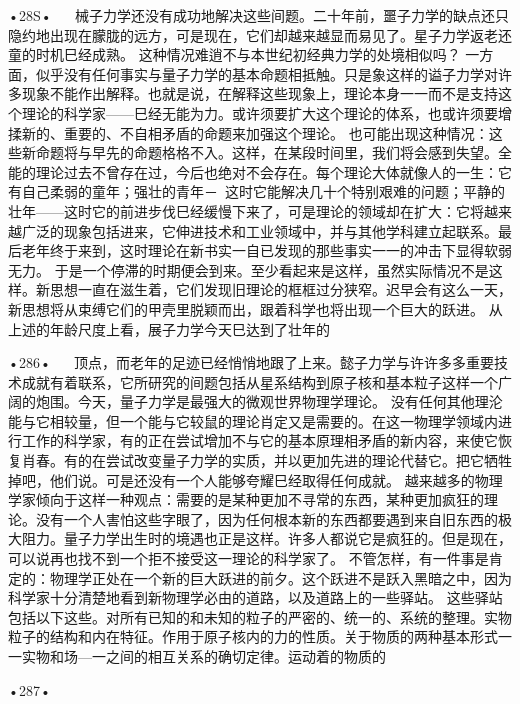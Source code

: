 •28S•
  
械子力学还没有成功地解决这些间题。二十年前，噩子力学的缺点还只隐约地出现在朦胧的远方，可是现在，它们却越来越显而易见了。星子力学返老还童的时机巳经成熟。
这种情况难逍不与本世纪初经典力学的处境相似吗？
一方面，似乎没有任何事实与量子力学的基本命题相抵触。只是象这样的谥子力学对许多现象不能作出解释。也就是说，在解释这些现象上，理论本身一一而不是支持这个理论的科学家——巳经无能为力。或许须要扩大这个理论的体系，也或许须要增揉新的、重要的、不自相矛盾的命题来加强这个理论。
也可能出现这种情况：这些新命题将与早先的命题格格不入。这样，在某段时间里，我们将会感到失望。全能的理论过去不曾存在过，今后也绝对不会存在。每个理论大体就像人的一生：它有自己柔弱的童年；强壮的青年－~这时它能解决几十个特别艰难的问题；平静的壮年——这时它的前进步伐巳经缓慢下来了，可是理论的领域却在扩大：它将越来越广泛的现象包括进来，它伸进技术和工业领域中，并与其他学科建立起联系。最后老年终于来到，这时理论在新书实一自已发现的那些事实一一的冲击下显得软弱无力。
于是一个停滞的时期便会到来。至少看起来是这样，虽然实际情况不是这样。新思想一直在滋生着，它们发现旧理论的框框过分狭窄。迟早会有这么一天，新思想将从束缚它们的甲壳里脱颖而出，跟着科学也将出现一个巨大的跃进。
从上述的年龄尺度上看，展子力学今天巳达到了壮年的

•286•
  
顶点，而老年的足迹已经悄悄地跟了上来。懿子力学与许许多多重要技术成就有着联系，它所研究的间题包括从星系结构到原子核和基本粒子这样一个广阔的炮围。今天，量子力学是最强大的微观世界物理学理论。
没有任何其他理沦能与它相较量，但一个能与它较鼠的理论肖定又是需要的。在这一物理学领域内进行工作的科学家，有的正在尝试增加不与它的基本原理相矛盾的新内容，来使它恢复肖春。有的在尝试改变量子力学的实质，并以更加先进的理论代替它。把它牺牲掉吧，他们说。可是还没有一个人能够夸耀巳经取得任何成就。
越来越多的物理学家倾向于这样一种观点：需要的是某种更加不寻常的东西，某种更加疯狂的理论。没有一个人害怕这些字眼了，因为任何根本新的东西都要遇到来自旧东西的极大阻力。量子力学出生时的境遇也正是这样。许多人都说它是疯狂的。但是现在，可以说再也找不到一个拒不接受这一理论的科学家了。
不管怎样，有一件事是肯定的：物理学正处在一个新的巨大跃进的前夕。这个跃进不是跃入黑暗之中，因为科学家十分清楚地看到新物理学必由的道路，以及道路上的一些驿站。
这些驿站包括以下这些。对所有已知的和未知的粒子的严密的、统一的、系统的整理。实物粒子的结构和内在特征。作用于原子核内的力的性质。关于物质的两种基本形式一一实物和场—一之间的相互关系的确切定律。运动着的物质的

•287•
  




